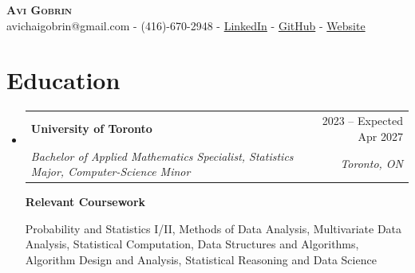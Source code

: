 \documentclass[letterpaper,11pt]{article}
\makeatletter
\newcommand{\resumeSubheading}[4]{
  \vspace{-2pt}\item
    \begin{tabular*}{0.97\textwidth}[t]{l@{\extracolsep{\fill}}r}
      \textbf{#1} & #2 \\
      \textit{\small#3} & \textit{\small #4} \\
    \end{tabular*}\vspace{-5pt}
}
\newcommand{\resumeSubHeadingListStart}{\begin{itemize}[leftmargin=0.15in, label={}]}
\newcommand{\resumeSubHeadingListEnd}{\end{itemize}}
\makeatother
\begin{document}
\begin{center}
    \textbf{\Huge \scshape Avi Gobrin} \\ \vspace{4pt}
    \small avichaigobrin@gmail.com - (416)-670-2948 - \href{https://www.linkedin.com/in/avigobrin/}{\color{blue} LinkedIn} - \href{https://github.com/Avi-Gobrin}{\color{blue} GitHub} - \href{https://avi-gobrin.github.io/personal-site/}{\color{blue} Website} \vspace{-4pt}
\end{center}

\section{Education}
  \resumeSubHeadingListStart
    \resumeSubheading
      {University of Toronto}{2023 -- Expected Apr 2027}
      {Bachelor of Applied Mathematics Specialist, Statistics Major, Computer-Science Minor}{Toronto, ON}
      \vspace{4pt}

    {\bf Relevant Coursework}
\vspace{-7pt}
{\small\setlength{\topsep}{0pt}\setlength{\parskip}{0pt}
\begin{flushleft}
Probability and Statistics I/II, Methods of Data Analysis, Multivariate Data Analysis, Statistical Computation, Data Structures and Algorithms, Algorithm Design and Analysis, Statistical Reasoning and Data Science
\end{flushleft}}
  \resumeSubHeadingListEnd

\vspace{-15pt}
\end{document}
